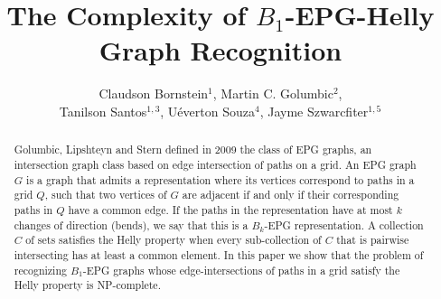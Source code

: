 \documentclass[preprint,12pt]{elsarticle} %
\begin{document}
\begin{frontmatter}



\title{The Complexity of $B_{1}$-EPG-Helly Graph Recognition}


\author{Claudson Bornstein$^{1}$, Martin C. Golumbic$^{2}$, \\Tanilson Santos$^{1,3}$, Uéverton Souza$^{4}$, Jayme Szwarcfiter$^{1,5}$
}

\address{$^{1}$Federal University of Rio de Janeiro - Brazil, 
\\$^{2}$University of Haifa - Israel,
\\$^{3}$Federal University of Tocantins  - Brazil, \\$^{4}$Fluminense Federal University - Brazil, \\$^{5}$State University of Rio de Janeiro - Brazil}



\begin{abstract}
Golumbic, Lipshteyn and Stern defined in 2009 the class of EPG graphs, an intersection graph class  based on edge intersection of paths on a grid. An EPG graph $G$ is a graph that admits a representation where its vertices correspond to paths in a grid $Q$, such that two vertices of $G$ are adjacent if and only if their corresponding paths in $Q$ have a common edge. If the paths in the representation have at most $k$ changes of direction  (bends), we say that this is a  $B_k$-EPG representation. A collection $C$ of sets satisfies the Helly property when every sub-collection of $C$ that is pairwise intersecting has at least a common element. In this paper we show that the problem of recognizing $B_1$-EPG graphs whose edge-intersections of paths in a grid satisfy the Helly property is NP-complete.  
\end{abstract}


\end{frontmatter}
\end{document}
